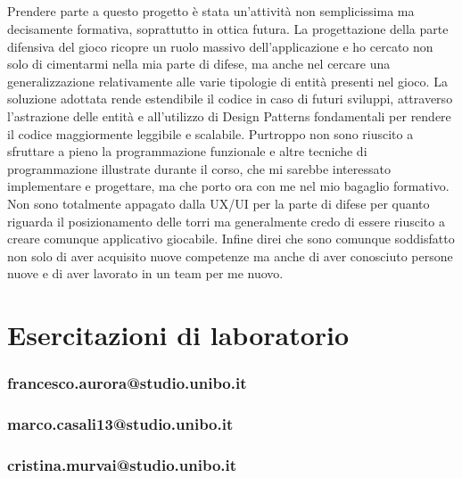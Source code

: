 \documentclass[a4paper,12pt]{report}
\begin{document}
\paragraph{}Prendere parte a questo progetto è stata un'attività non semplicissima ma decisamente formativa, soprattutto in ottica futura.
La progettazione della parte difensiva del gioco ricopre un ruolo massivo dell'applicazione e ho cercato non solo di cimentarmi nella mia parte di difese, ma anche nel cercare una generalizzazione relativamente alle varie tipologie di entità presenti nel gioco. La soluzione adottata rende estendibile il codice in caso di futuri sviluppi, attraverso l'astrazione delle entità e all'utilizzo di Design Patterns fondamentali per rendere il codice maggiormente leggibile e scalabile. Purtroppo non sono riuscito a sfruttare a pieno la programmazione funzionale e altre tecniche di programmazione illustrate durante il corso, che mi sarebbe interessato implementare e progettare, ma che porto ora con me nel mio bagaglio formativo. Non sono totalmente appagato dalla UX/UI per la parte di difese per quanto riguarda il posizionamento delle torri ma generalmente credo di essere riuscito a creare comunque applicativo giocabile. Infine direi che sono comunque soddisfatto non solo di aver acquisito nuove competenze ma anche di aver conosciuto persone nuove e di aver lavorato in un team per me nuovo.





\chapter{Esercitazioni di laboratorio}

\subsection{francesco.aurora@studio.unibo.it}

\subsection{marco.casali13@studio.unibo.it}

\subsection{cristina.murvai@studio.unibo.it}
\end{document}
